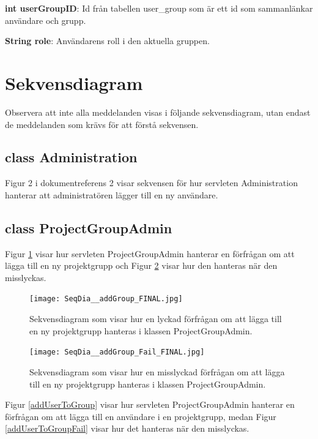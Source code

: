 \documentclass[a4paper]{article}
\begin{document}
\vspace{5mm}
\begin{hangparas}{1.5em}{1}
\textbf{int userGroupID}: Id från tabellen user\_group som är ett id som sammanlänkar användare och grupp.
\end{hangparas}

\vspace{5mm}
\begin{hangparas}{1.5em}{1}
\textbf{String role}: Användarens roll i den aktuella gruppen.
\end{hangparas}

\section{Sekvensdiagram}

Observera att inte alla meddelanden visas i följande sekvensdiagram, utan endast de meddelanden som krävs för att förstå sekvensen.

\subsection{class Administration}
Figur 2 i dokumentreferens 2 visar sekvensen för hur servleten Administration hanterar att administratören lägger till en ny användare.


\subsection{class ProjectGroupAdmin}
Figur \ref{addGroup} visar hur servleten ProjectGroupAdmin hanterar en förfrågan om att lägga till en ny projektgrupp och Figur \ref{addGroupFail} visar hur den hanteras när den misslyckas. 

\begin{figure}[h!]
\centering
\texttt{[image: SeqDia\_\_addGroup\_FINAL.jpg]}
\caption{Sekvensdiagram som visar hur en lyckad förfrågan om att lägga till en ny projektgrupp hanteras i klassen ProjectGroupAdmin. \label{addGroup}}
\end{figure}

\begin{figure}[h!]
\centering
\texttt{[image: SeqDia\_\_addGroup\_Fail\_FINAL.jpg]}
\caption{Sekvensdiagram som visar hur en misslyckad förfrågan om att lägga till en ny projektgrupp hanteras i klassen ProjectGroupAdmin. \label{addGroupFail}}
\end{figure}

\noindent
Figur \ref{addUserToGroup} visar hur servleten ProjectGroupAdmin hanterar en förfrågan om att lägga till en användare i en projektgrupp, medan Figur \ref{addUserToGroupFail} visar hur det hanteras när den misslyckas.
\end{document}
